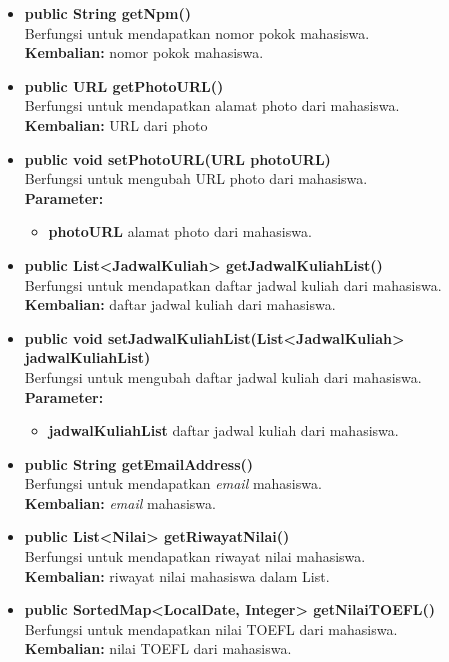 \begin{enumerate}
\begin{itemize}
\begin{itemize}
					\item \textbf{public String getNpm()}\\
						Berfungsi untuk mendapatkan nomor pokok mahasiswa.\\
						\textbf{Kembalian:} nomor pokok mahasiswa.
						
					\item \textbf{public URL getPhotoURL()}\\
						Berfungsi untuk mendapatkan alamat photo dari mahasiswa.\\
						\textbf{Kembalian:} URL dari photo
					
					\item \textbf{public void setPhotoURL(URL photoURL)}\\
						Berfungsi untuk mengubah URL photo dari mahasiswa.\\
						\textbf{Parameter:}
						\begin{itemize}
							\item \textbf{photoURL} alamat photo dari mahasiswa.
						\end{itemize}
						
					\item \textbf{public List<JadwalKuliah> getJadwalKuliahList()}\\
						Berfungsi untuk mendapatkan daftar jadwal kuliah  dari mahasiswa.\\
						\textbf{Kembalian:} daftar jadwal kuliah dari mahasiswa.
					
					\item \textbf{public void setJadwalKuliahList(List<JadwalKuliah> jadwalKuliahList)}\\
						Berfungsi untuk mengubah daftar jadwal kuliah dari mahasiswa.\\
						\textbf{Parameter:}
						\begin{itemize}
							\item \textbf{jadwalKuliahList} daftar jadwal kuliah dari mahasiswa.
						\end{itemize}
					
					\item \textbf{public String getEmailAddress()}\\
						Berfungsi untuk mendapatkan \textit{email} mahasiswa.\\
						\textbf{Kembalian:} \textit{email} mahasiswa.
						
					\item \textbf{public List<Nilai> getRiwayatNilai()}\\
						Berfungsi untuk mendapatkan riwayat nilai mahasiswa.\\
						\textbf{Kembalian:} riwayat nilai mahasiswa dalam List.
					\item \textbf{public SortedMap<LocalDate, Integer> getNilaiTOEFL()}\\
						Berfungsi untuk mendapatkan nilai TOEFL  dari mahasiswa.\\
						\textbf{Kembalian:} nilai TOEFL dari mahasiswa.
					

\end{itemize}
\end{itemize}
\end{enumerate}
